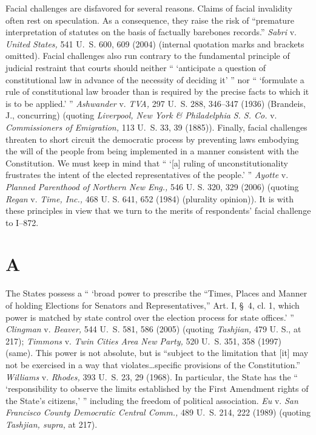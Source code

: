   Facial challenges are disfavored for several reasons. Claims of
facial invalidity often rest on speculation. As a consequence, they
raise the risk of ``premature interpretation of statutes on the
basis of factually barebones records.'' \emph{Sabri} v. \emph{United
States,} 541 U.~S. 600, 609 (2004) (internal quotation marks and
brackets omitted). Facial challenges also run contrary to the
fundamental principle of judicial restraint that courts should neither
`` ‘anticipate a question of constitutional law in advance of
the necessity of deciding it' '' nor `` ‘formulate a rule of
constitutional law broader than is required by the precise facts to
which it is to be applied.' '' \emph{Ashwander} v. \emph{TVA,} 297 U.~S.
288, 346--347 (1936) (Brandeis, J., concurring) (quoting \emph{Liverpool,
New York \& Philadelphia} \newpage  \emph{S. S. Co.} v. \emph{Commissioners of
Emigration,} 113 U.~S. 33, 39 (1885)). Finally, facial challenges
threaten to short circuit the democratic process by preventing laws
embodying the will of the people from being implemented in a manner
consistent with the Constitution. We must keep in mind that `` ‘[a]
ruling of unconstitutionality frustrates the intent of the elected
representatives of the people.' '' \emph{Ayotte} v. \emph{Planned
Parenthood of Northern New Eng.,} 546 U. S. 320, 329 (2006) (quoting
\emph{Regan} v. \emph{Time, Inc.,} 468 U. S. 641, 652 (1984) (plurality
opinion)). It is with these principles in view that we turn to the
merits of respondents' facial challenge to I--872.

\section{A}

  The States possess a `` ‘broad power to prescribe the
``Times, Places and Manner of holding Elections for Senators and
Representatives,'' Art. I, \S~4, cl. 1, which power is matched
by state control over the election process for state offices.' ''
\emph{Clingman} v. \emph{Beaver,} 544 U.~S. 581, 586 (2005) (quoting
\emph{Tashjian,} 479 U. S., at 217); \emph{Timmons} v. \emph{Twin Cities Area
New Party,} 520 U.~S. 351, 358 (1997) (same). This power is not
absolute, but is ``subject to the limitation that [it] may not be
exercised in a way that violates\dots specific provisions of the
Constitution.'' \emph{Williams} v. \emph{Rhodes,} 393 U.~S. 23, 29
(1968). In particular, the State has the `` ‘responsibility
to observe the limits established by the First Amendment rights of
the State's citizens,' '' including the freedom of political
association. \emph{Eu} v. \emph{San Francisco County Democratic Central
Comm.,} 489 U.~S. 214, 222 (1989) (quoting \emph{Tashjian, supra,} at
217).

